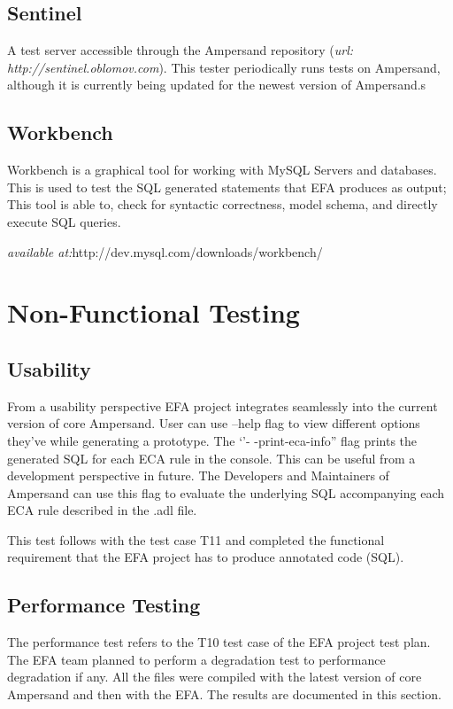 \documentclass[12pt, svgnames]{article}
\begin{document}
\subsection*{Sentinel}
A test server accessible through the Ampersand repository (\textit{url: 
http://sentinel.oblomov.com}). This tester periodically runs tests on 
Ampersand, although it is currently being updated for the newest version of 
Ampersand.s

\subsection{Workbench}
Workbench is a graphical tool for working with MySQL Servers and databases. 
This is used to test the SQL generated statements that EFA produces as output; 
This tool is able to, check for syntactic correctness, model schema, and 
directly execute SQL queries.

\textit{available at:}http://dev.mysql.com/downloads/workbench/ 
\section{Non-Functional Testing}

\subsection{Usability}
From a usability perspective EFA project integrates seamlessly into the current version of core Ampersand. User can use --help flag to view different options they've while generating a prototype. The `'- -print-eca-info'' flag prints the generated SQL for each ECA rule in the console. This can be useful from a development perspective in future. The Developers and Maintainers of Ampersand can use this flag to evaluate the underlying SQL accompanying each ECA rule described in the .adl file.

This test follows with the test case T11 and completed the functional requirement that the EFA project has to produce annotated code (SQL).

\subsection{Performance Testing}
The performance test refers to the T10 test case of the EFA project test plan. The EFA team planned to perform a degradation test to performance degradation if any. All the files were compiled with the latest version of core Ampersand and then with the EFA. The results are documented in this section. 
\end{document}
